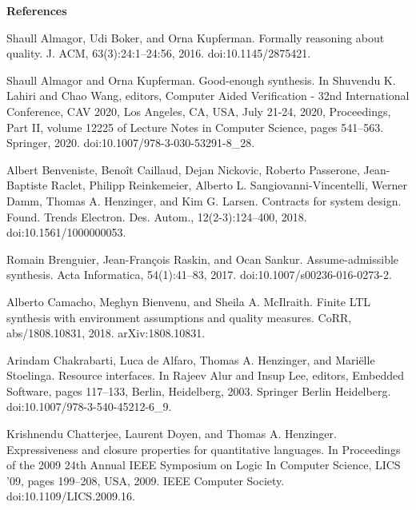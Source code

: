 
 
\par\medskip\noindent\textbf{References}\par
  
\par\noindent  [1]  Shaull Almagor, Udi Boker, and Orna Kupferman.  Formally reasoning about quality.  J. ACM, 63(3):24:1–24:56, 2016.  doi:10.1145/2875421.  
 
\par\noindent  [2]  Shaull Almagor and Orna Kupferman.  Good-enough synthesis.  In Shuvendu K. Lahiri and Chao Wang, editors, Computer Aided Verification - 32nd International Conference, CAV 2020, Los Angeles, CA, USA, July 21-24, 2020, Proceedings, Part II, volume 12225 of Lecture Notes in Computer Science, pages 541–563. Springer, 2020.  doi:10.1007/978-3-030-53291-8\_28.  
 
\par\noindent  [3]  Albert Benveniste, Benoît Caillaud, Dejan Nickovic, Roberto Passerone, Jean-Baptiste Raclet, Philipp Reinkemeier, Alberto L. Sangiovanni-Vincentelli, Werner Damm, Thomas A. Henzinger, and Kim G. Larsen.  Contracts for system design.  Found. Trends Electron. Des. Autom., 12(2-3):124–400, 2018.  doi:10.1561/1000000053.  
 
\par\noindent  [4]  Romain Brenguier, Jean-François Raskin, and Ocan Sankur.  Assume-admissible synthesis.  Acta Informatica, 54(1):41–83, 2017.  doi:10.1007/s00236-016-0273-2.  
 
\par\noindent  [5]  Alberto Camacho, Meghyn Bienvenu, and Sheila A. McIlraith.  Finite LTL synthesis with environment assumptions and quality measures.  CoRR, abs/1808.10831, 2018.  arXiv:1808.10831.  
 
\par\noindent  [6]  Arindam Chakrabarti, Luca de Alfaro, Thomas A. Henzinger, and Mariëlle Stoelinga.  Resource interfaces.  In Rajeev Alur and Insup Lee, editors, Embedded Software, pages 117–133, Berlin, Heidelberg, 2003. Springer Berlin Heidelberg.  doi:10.1007/978-3-540-45212-6\_9.  
 
\par\noindent  [7]  Krishnendu Chatterjee, Laurent Doyen, and Thomas A. Henzinger.  Expressiveness and closure properties for quantitative languages.  In Proceedings of the 2009 24th Annual IEEE Symposium on Logic In Computer Science, LICS ’09, pages 199–208, USA, 2009. IEEE Computer Society.  doi:10.1109/LICS.2009.16.  
 
